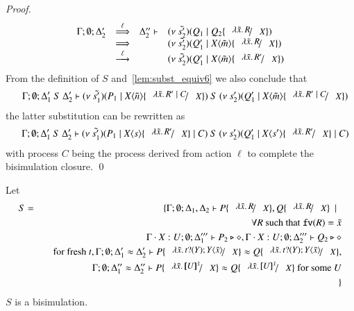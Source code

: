 \begin{proof}
%
\[
	\begin{array}{rcll}
		\Gamma; \es; \Delta_2' &\By{\ell}& \Delta_2'' \proves &
		\newsp{\tilde{s_2'}}{Q_1 \Par Q_2 \subst{\abs{\tilde{x}}{R}}{X}}\\
		&\By{}& &
		\newsp{\tilde{s_2'}}{Q_1' \Par \appl{X}{\tilde{m}} \subst{\abs{\tilde{x}}{R}}{X}} \\
		&\by{\ell}& &
		\newsp{\tilde{s_2'}}{Q_1' \Par \appl{X}{\tilde{m}} \subst{\abs{\tilde{x}}{R'}}{X}} \\
	\end{array}
\]
%
	\noi From the definition of $S$ and~\ref{lem:subst_equiv6}
	we also conclude that
	\begin{eqnarray*}
		&&\Gamma; \es; \Delta_1'\ S\ \Delta_2' \proves 
		\newsp{\tilde{s_1'}}{P_1 \Par \appl{X}{\tilde{n}} \subst{\abs{\tilde{x}}{R' \Par C}}{X}}\ S\ \newsp{s_2'}{Q_1' \Par \appl{X}{\tilde{m}} \subst{\abs{\tilde{x}}{R' \Par C}}{X}}
	\end{eqnarray*}
	\noi the latter substitution can be rewritten as
	\begin{eqnarray*}
		&&\Gamma; \es; \Delta_1'\ S\ \Delta_2' \proves 
		\newsp{\tilde{s_1'}}{P_1 \Par \appl{X}{s} \subst{\abs{\tilde{x}}{R'}}{X} \Par C}\ S\ \newsp{s_2'}{Q_1' \Par \appl{X}{s'} \subst{\abs{\tilde{x}}{R'}}{X} \Par C}
	\end{eqnarray*}
	\noi with process $C$ being the process derived from action $\ell$
	to complete the bisimulation closure.
	\qed
\end{proof}

\begin{corollary}\rm
	\label{cor:subst_equiv}
	Let
	\begin{eqnarray*}
		S &=& \set{ \Gamma; \es; \Delta_1, \Delta_2 \proves P \subst{\abs{\tilde{x}}{R}}{X}, Q \subst{\abs{\tilde{x}}{R}}{X} \setbar \\
		&& \quad \forall R \textrm{ such that } \fv{R} = \tilde{x}\\
		&& \quad \Gamma \cat X: U; \es;\Delta_1''' \proves P_2 \hastype \Proc, \Gamma \cat X: U; \es; \Delta_2''' \proves Q_2 \hastype \Proc\\
		&& \quad \textrm{for fresh } t,  \Gamma; \es; \Delta_1' \wb \Delta_2' \proves P \subst{\abs{\tilde{x}}{\binp{t}{Y} \appl{Y}{\tilde{x}}}}{X} \wb Q \subst{\abs{\tilde{x}}{\binp{t}{Y} \appl{Y}{\tilde{x}}}}{X}, \\
		&& \quad \Gamma; \es; \Delta_1'' \wb \Delta_2'' \proves P \subst{\abs{\tilde{x}}{\map{U}^{\tilde{x}}}}{X} \wb Q \subst{\abs{\tilde{x}}{\map{U}^{\tilde{x}}}}{X} \textrm{ for some } U \\
		&&}
	\end{eqnarray*}
	$S$ is a bisimulation.
\end{corollary}

